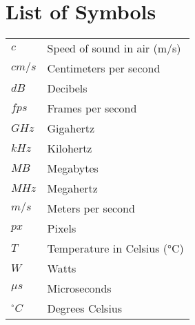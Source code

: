 \cleardoublepage
\section*{List of Symbols}
\begin{center}
\begin{tabular}{@{}p{2cm}p{\dimexpr\textwidth-4cm}@{}}
  $c$ & Speed of sound in air (m/s) \\
  $cm/s$ & Centimeters per second \\
  $dB$ & Decibels \\
  $fps$ & Frames per second \\
  $GHz$ & Gigahertz \\
  $kHz$ & Kilohertz \\
  $MB$ & Megabytes \\
  $MHz$ & Megahertz \\
  $m/s$ & Meters per second \\
  $px$ & Pixels \\
  $T$ & Temperature in Celsius (°C) \\
  $W$ & Watts \\
  $\mu s$ & Microseconds \\
  $^\circ C$ & Degrees Celsius \\
\end{tabular}

\printglossary

\end{center}